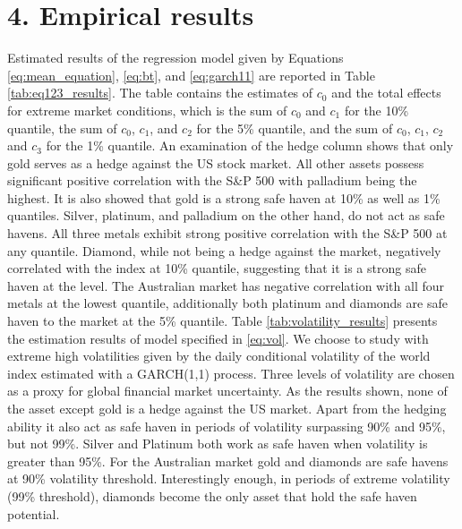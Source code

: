 \documentclass[preprint,authoryear,11pt]{elsarticle}
\begin{document}
\section{4. Empirical results}
\label{sec:results}
Estimated results of the regression model given by Equations \eqref{eq:mean_equation}, \eqref{eq:bt}, and \eqref{eq:garch11} are reported in Table \ref{tab:eq123_results}. The table contains the estimates of $c_{0}$ and the total effects for extreme market conditions, which is the sum of $c_{0}$ and $c_{1}$ for the 10\% quantile, the sum of $c_{0}$, $c_{1}$, and $c_{2}$ for the 5\% quantile, and the sum of $c_{0}$, $c_{1}$, $c_{2}$ and $c_{3}$ for the 1\% quantile.
\newline\newline
\noindent An examination of the hedge column shows that only gold serves as a hedge against the US stock market. All other assets possess significant positive correlation with the S\&P 500 with palladium being the highest. It is also showed that gold is a strong safe haven at 10\% as well as 1\% quantiles. Silver, platinum, and palladium on the other hand, do not act as safe havens. All three metals exhibit strong positive correlation with the S\&P 500 at any quantile. Diamond, while not being a hedge against the market, negatively correlated with the index at 10\% quantile, suggesting that it is a strong safe haven at the level. The Australian market has negative correlation with all four metals at the lowest quantile, additionally both platinum and diamonds are safe haven to the market at the 5\% quantile.
\newline\newline
\noindent Table \ref{tab:volatility_results} presents the estimation results of model specified in \eqref{eq:vol}. We choose to study with extreme high volatilities given by the daily conditional volatility of the world index estimated with a GARCH(1,1) process. Three levels of volatility are chosen as a proxy for global financial market uncertainty. As the results shown, none of the asset except gold is a hedge against the US market. Apart from the hedging ability it also act as safe haven in periods of volatility surpassing 90\% and 95\%, but not 99\%. Silver and Platinum both work as safe haven when volatility is greater than 95\%. For the Australian market gold and diamonds are safe havens at 90\% volatility threshold. Interestingly enough, in periods of extreme volatility (99\% threshold), diamonds become the only asset that hold the safe haven potential.
\end{document}
